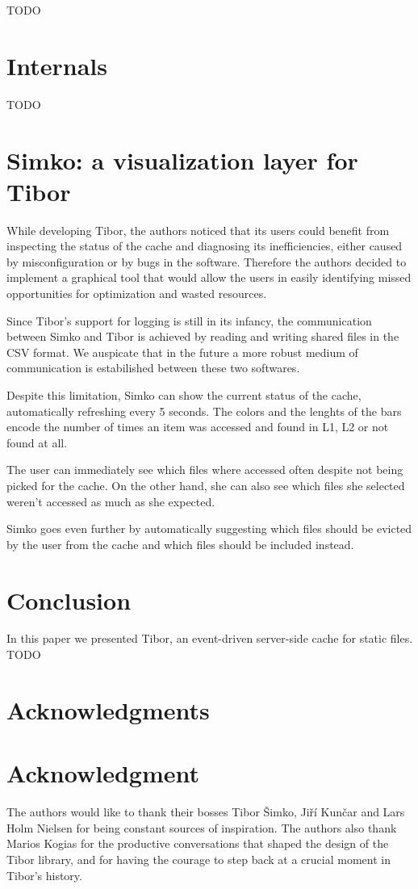 \documentclass[conference,compsoc]{IEEEtran}
\begin{document}
TODO

\section{Internals}
TODO

\section{Simko: a visualization layer for Tibor}
While developing Tibor, the authors noticed that its users could benefit from
inspecting the status of the cache and diagnosing its inefficiencies, either
caused by misconfiguration or by bugs in the software. Therefore the authors
decided to implement a graphical tool that would allow the users in easily
identifying missed opportunities for optimization and wasted resources.

Since Tibor's support for logging is still in its infancy, the communication
between Simko and Tibor is achieved by reading and writing shared files in the
CSV format. We auspicate that in the future a more robust medium of
communication is estabilished between these two softwares.

Despite this limitation, Simko can show the current status of the cache,
automatically refreshing every 5 seconds. The colors and the lenghts of the
bars encode the number of times an item was accessed and found in L1, L2 or not
found at all.

The user can immediately see which files where accessed often despite not being
picked for the cache. On the other hand, she can also see which files she
selected weren't accessed as much as she expected.

Simko goes even further by automatically suggesting which files should be
evicted by the user from the cache and which files should be included instead.

\section{Conclusion}
In this paper we presented Tibor, an event-driven server-side cache for static
files. TODO

\ifCLASSOPTIONcompsoc
  \section*{Acknowledgments}
\else
  \section*{Acknowledgment}
\fi

The authors would like to thank their bosses Tibor Šimko, Jiří Kunčar and Lars
Holm Nielsen for being constant sources of inspiration. The authors also thank
Marios Kogias for the productive conversations that shaped the design of the
Tibor library, and for having the courage to step back at a crucial moment in
Tibor's history.
\end{document}

